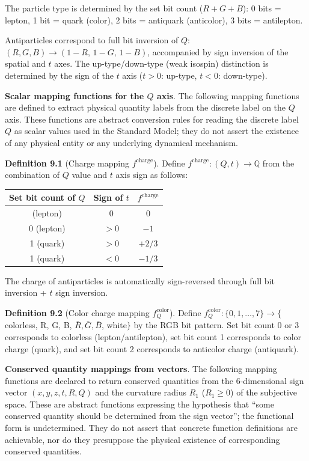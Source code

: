 \documentclass[
  a4paper,11pt]{article}
\newcounter{none}
\theoremstyle{definition}
\theoremstyle{remark}
\begin{document}
The particle type is determined by the set bit count (\(R + G + B\)): 0
bits = lepton, 1 bit = quark (color), 2 bits = antiquark (anticolor), 3
bits = antilepton.

Antiparticles correspond to full bit inversion of \(Q\):
\((R, G, B) \to (1{-}R,\, 1{-}G,\, 1{-}B)\), accompanied by sign
inversion of the spatial and \(t\) axes. The up-type/down-type (weak
isospin) distinction is determined by the sign of the \(t\) axis
(\(t > 0\): up-type, \(t < 0\): down-type).

\textbf{Scalar mapping functions for the \(Q\) axis}. The following
mapping functions are defined to extract physical quantity labels from
the discrete label on the \(Q\) axis. These functions are abstract
conversion rules for reading the discrete label \(Q\) as scalar values
used in the Standard Model; they do not assert the existence of any
physical entity or any underlying dynamical mechanism.

\textbf{Definition 9.1} (Charge mapping \(f^{\text{charge}}\)). Define
\(f^{\text{charge}}: (Q, t) \to \mathbb{Q}\) from the combination of
\(Q\) value and \(t\) axis sign as follows:

{\def\LTcaptype{none} %
\begin{longtable}[]{@{}ccc@{}}
\toprule\noalign{}
Set bit count of \(Q\) & Sign of \(t\) & \(f^{\text{charge}}\) \\
\midrule\noalign{}
\endhead
\bottomrule\noalign{}
\endlastfoot
0 (lepton) & \(0\) & \(0\) \\
0 (lepton) & \(> 0\) & \(-1\) \\
1 (quark) & \(> 0\) & \(+2/3\) \\
1 (quark) & \(< 0\) & \(-1/3\) \\
\end{longtable}
}

The charge of antiparticles is automatically sign-reversed through full
bit inversion + \(t\) sign inversion.

\textbf{Definition 9.2} (Color charge mapping \(f_Q^{\text{color}}\)).
Define \(f_Q^{\text{color}}: \{0, 1, \ldots, 7\} \to \{\)colorless, R,
G, B, \(\bar{R}, \bar{G}, \bar{B}\), white\(\}\) by the RGB bit pattern.
Set bit count 0 or 3 corresponds to colorless (lepton/antilepton), set
bit count 1 corresponds to color charge (quark), and set bit count 2
corresponds to anticolor charge (antiquark).

\textbf{Conserved quantity mappings from vectors}. The following mapping
functions are declared to return conserved quantities from the
6-dimensional sign vector \((x, y, z, t, R, Q)\) and the curvature
radius \(R_1\) (\(R_1 \geq 0\)) of the subjective space. These are
abstract functions expressing the hypothesis that ``some conserved
quantity should be determined from the sign vector''; the functional
form is undetermined. They do not assert that concrete function
definitions are achievable, nor do they presuppose the physical
existence of corresponding conserved quantities.
\end{document}
